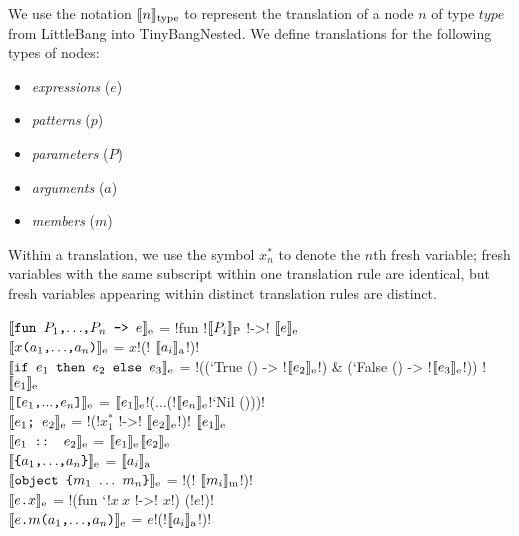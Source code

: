 \documentclass{article}
\begin{document}
\newcommand{\translate}[2]{\ensuremath{\llbracket\texttt{#2}\rrbracket_{\textnormal{#1}}}}
\newcommand{\fresh}[1]{\ensuremath{x^*_{#1}}}
\newcommand{\secheader}[1]{\par\noindent{\sc #1}\noindent\unskip}

We use the notation $\translate{type}{\ensuremath{n}}$ to represent the translation of a node $n$ of type $type$ from LittleBang into TinyBangNested.  We define translations for the following types of nodes:

\begin{itemize}
    \item \emph{expressions} ($e$)
    \item \emph{patterns} ($p$)
    \item \emph{parameters} ($P$)
    \item \emph{arguments} ($a$)
    \item \emph{members} ($m$)
\end{itemize}

Within a translation, we use the symbol $\fresh{n}$ to denote the $n$th fresh variable; fresh variables with the same subscript within one translation rule are identical, but fresh variables appearing within distinct translation rules are distinct.

\vspace*{3mm}
\secheader{Expressions}

\translate{e}{fun $P_1$,$\ldots$,$P_n$ -> $e$} = \lbil!fun !\translate{P}{$P_i$} \lbil!->! \translate{e}{$e$} \\
\translate{e}{$x$\texttt{(}$a_1$,$\ldots$,$a_n$\texttt{)}} = $x$\lbil!(! \translate{a}{$a_i$}\lbil!)!\\
\translate{e}{if $e_1$ then $e_2$ else $e_3$} = \lbil!((`True () -> !\translate{e}{$e_2$}\lbil!) & (`False () -> !\translate{e}{$e_3$}\lbil!)) !\translate{e}{$e_1$}\\
\translate{e}{[$e_1$,$...$,$e_n$]} = \listhd \translate{e}{$e_1$}\lbonion\listtl \lbil!(...(!\listhd\translate{e}{$e_n$}\lbonion\listtl \lbil!`Nil ()))!\\
\translate{e}{$e_1$; $e_2$} = \lbil!(!\fresh{1} \lbil!->! \translate{e}{$e_2$}\lbil!)! \translate{e}{$e_1$}\\
\translate{e}{$e_1$ :: $e_2$} = \listhd\translate{e}{$e_1$}\lbonion\listtl\translate{e}{$e_2$}\\
\translate{e}{\char`\{$a_1$,$\ldots$,$a_n$\char`\}} =  \translate{a}{$a_i$}\\
\translate{e}{object \char`\{$m_1$ $\ldots$ $m_n$\char`\}} = \lbseal\lbil!(! \translate{m}{$m_i$}\lbil!)!\\
\translate{e}{$e$.$x$} = \lbil!(fun `!$x~x$ \lbil!->! $x$\lbil!) (!$e$\lbil!)! \\
\translate{e}{$e$.$m$($a_1$,$\ldots$,$a_n$)} = $e$\lbil!(!\translate{a}{$a_i$}\lbil!)! \\
\end{document}
